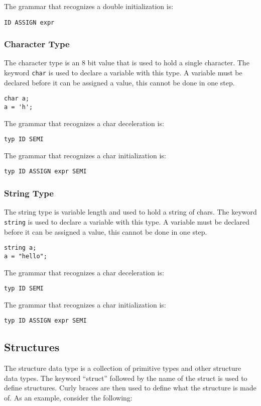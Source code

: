 \documentclass{article}
\begin{document}
The grammar that recognizes a double initialization is: 
\begin{Verbatim}[frame=single]
ID ASSIGN expr
\end{Verbatim}

\subsubsection{Character Type}
The character type is an 8 bit value that is used to hold a single character. The keyword \texttt{char} is used to declare a variable with this type.  A variable must be declared before it can be assigned a value, this cannot be done in one step.
\begin{lstlisting}
char a;
a = 'h';
\end{lstlisting}

The grammar that recognizes a char deceleration is: 
\begin{Verbatim}[frame=single]
typ ID SEMI
\end{Verbatim}

The grammar that recognizes a char initialization is: 
\begin{Verbatim}[frame=single]
typ ID ASSIGN expr SEMI
\end{Verbatim}

\subsubsection{String Type}
The string type is variable length and used to hold a string of chars.  The keyword \texttt{string} is used to declare a variable with this type.  A variable must be declared before it can be assigned a value, this cannot be done in one step.
\begin{lstlisting}
string a;
a = "hello";
\end{lstlisting}

The grammar that recognizes a char deceleration is: 
\begin{Verbatim}[frame=single]
typ ID SEMI
\end{Verbatim}

The grammar that recognizes a char initialization is: 
\begin{Verbatim}[frame=single]
typ ID ASSIGN expr SEMI
\end{Verbatim}

\subsection{Structures}
The structure data type is a collection of primitive types and other structure data types. The keyword ``struct'' followed by the name of the struct is used to define structures. Curly braces are then used to define what the structure is made of. As an example, consider the following:
\end{document}
